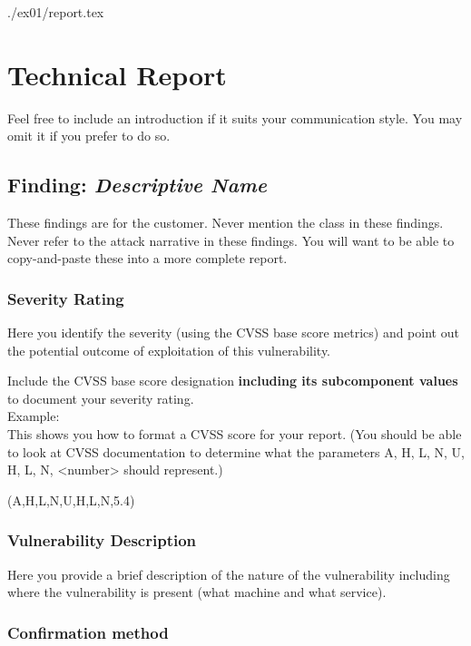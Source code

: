./ex01/report.tex

\section{Technical Report}

Feel free to include an introduction if it suits your communication style.
You may omit it if you prefer to do so.


  \subsection{Finding: \emph{Descriptive Name}}
  
    These findings are for the customer.
    Never mention the class in these findings.
    Never refer to the attack narrative in these findings.
    You will want to be able to copy-and-paste these into a more complete report.

	\subsubsection*{Severity Rating}
		Here you identify the severity (using the CVSS base score metrics)
		and point out the potential outcome of exploitation of this
		vulnerability.

		Include the CVSS base score designation \textbf{including its
		subcomponent values} to document your	severity rating.\\
		Example: \\
	   	This shows you how to format a CVSS score for your report.
	   	(You should be able to look at CVSS documentation to
	   	determine what the parameters A, H, L, N, U, H, L, N,
	   	<number> should represent.)
	   	
	    
		\cvss(A,H,L,N,U,H,L,N,5.4)
		
  	\subsubsection*{Vulnerability Description}
  		Here you provide a brief description of the nature of the vulnerability
  		including where the vulnerability is present (what machine and
  		what service).
  		
  	\subsubsection*{Confirmation method}
  	
